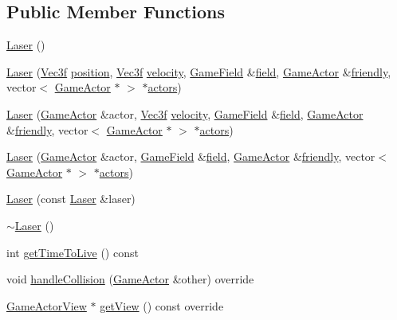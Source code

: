 \subsection*{Public Member Functions}
\begin{DoxyCompactItemize}
\item 
\hyperlink{class_laser_a68465e89283dffcc29a37e94693c6f87}{Laser} ()
\item 
\hyperlink{class_laser_a326b845c80bcf384cd91452364805d4d}{Laser} (\hyperlink{class_vec3f}{Vec3f} \hyperlink{class_game_actor_aefed3c91bf32ad388d86657b3bb9ddfa}{position}, \hyperlink{class_vec3f}{Vec3f} \hyperlink{class_game_actor_a95518bf01411eafe983df8815e8682d1}{velocity}, \hyperlink{class_game_field}{Game\+Field} \&\hyperlink{class_game_actor_a0224fbc502abd6b7579787aa234332d5}{field}, \hyperlink{class_game_actor}{Game\+Actor} \&\hyperlink{class_projectile_a54dec73f149e6619fac8f5cf8910edcc}{friendly}, vector$<$ \hyperlink{class_game_actor}{Game\+Actor} $\ast$ $>$ $\ast$\hyperlink{class_game_actor_a2405618d895f5143b42ae9e94d20e693}{actors})
\item 
\hyperlink{class_laser_abcdb5d7610f089ddee97c9d512892ce7}{Laser} (\hyperlink{class_game_actor}{Game\+Actor} \&actor, \hyperlink{class_vec3f}{Vec3f} \hyperlink{class_game_actor_a95518bf01411eafe983df8815e8682d1}{velocity}, \hyperlink{class_game_field}{Game\+Field} \&\hyperlink{class_game_actor_a0224fbc502abd6b7579787aa234332d5}{field}, \hyperlink{class_game_actor}{Game\+Actor} \&\hyperlink{class_projectile_a54dec73f149e6619fac8f5cf8910edcc}{friendly}, vector$<$ \hyperlink{class_game_actor}{Game\+Actor} $\ast$ $>$ $\ast$\hyperlink{class_game_actor_a2405618d895f5143b42ae9e94d20e693}{actors})
\item 
\hyperlink{class_laser_ac8b00c242912954900642b341d6e7337}{Laser} (\hyperlink{class_game_actor}{Game\+Actor} \&actor, \hyperlink{class_game_field}{Game\+Field} \&\hyperlink{class_game_actor_a0224fbc502abd6b7579787aa234332d5}{field}, \hyperlink{class_game_actor}{Game\+Actor} \&\hyperlink{class_projectile_a54dec73f149e6619fac8f5cf8910edcc}{friendly}, vector$<$ \hyperlink{class_game_actor}{Game\+Actor} $\ast$ $>$ $\ast$\hyperlink{class_game_actor_a2405618d895f5143b42ae9e94d20e693}{actors})
\item 
\hyperlink{class_laser_a46c640df78e3ee5c367216a5306cfc5c}{Laser} (const \hyperlink{class_laser}{Laser} \&laser)
\item 
\hyperlink{class_laser_aa9baee5ed9775426e0b1d563c4687711}{$\sim$\+Laser} ()
\item 
int \hyperlink{class_laser_ae1d4d2df6586402139d480a9c5324610}{get\+Time\+To\+Live} () const 
\item 
void \hyperlink{class_laser_a6c26eb024fd0ae01920c299d1af2679d}{handle\+Collision} (\hyperlink{class_game_actor}{Game\+Actor} \&other) override
\item 
\hyperlink{class_game_actor_view}{Game\+Actor\+View} $\ast$ \hyperlink{class_laser_af00728fe7cabd4f63cb5ce66f4c50e86}{get\+View} () const override
\end{DoxyCompactItemize}
